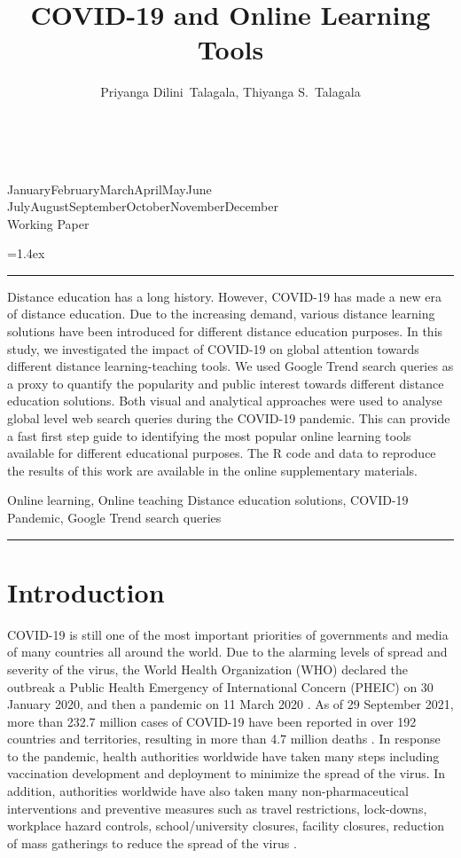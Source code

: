 \documentclass[11pt,a4paper,]{article}
\title{COVID-19 and Online Learning Tools}
\author{Priyanga Dilini~Talagala, Thiyanga S.~Talagala}
\date{\sf\Date~\Month~\Year}
\makeatletter
\def\Date{\number\day}
\def\Month{\ifcase\month\or
 January\or February\or March\or April\or May\or June\or
 July\or August\or September\or October\or November\or December\fi}
\def\Year{\number\year}
\def\showjel{{\large\textsf{\textbf{JEL classification:}}~\@jel}}
\def\cover{{\sffamily\setcounter{page}{0}
        \thispagestyle{empty}
        \vspace*{2cm}
        \begin{center}
        \fbox{\parbox{14cm}{\begin{onehalfspace}\centering\Huge\vspace*{0.3cm}
                \textsf{\textbf{\expandafter{\@title}}}\vspace{1cm}\par
                \LARGE\@author\end{onehalfspace}
        }}
        \end{center}
        \vfill
                \begin{center}\Large
                \Month~\Year\\[1cm]
                Working Paper \@wp
        \end{center}\vspace*{2cm}}}
\def\pageone{{\sffamily\setstretch{1}%
        \thispagestyle{empty}%
        \vbox to \textheight{%
        \raggedright\baselineskip=1.2cm
     {\fontsize{24.88}{30}\sffamily\textbf{\expandafter{\@title}}}
        \vspace{2cm}\par
        \hspace{1cm}\parbox{14cm}{\sffamily\large\@addresses}\vspace{1cm}\vfill
        \hspace{1cm}{\large\Date~\Month~\Year}\\[1cm]
        \hspace{1cm}\showjel\vss}}}
\def\blindtitle{{\sffamily
     \thispagestyle{plain}\raggedright\baselineskip=1.2cm
     {\fontsize{24.88}{30}\sffamily\textbf{\expandafter{\@title}}}\vspace{1cm}\par
        }}
\def\titlepage{{\cover\newpage\pageone\newpage\blindtitle}}
\let\maketitle\titlepage
\newenvironment{keywords}{\par\vspace{0.5cm}\noindent{\sffamily\textbf{Keywords:}}}{\vspace{0.25cm}\par\hrule\vspace{0.5cm}\par}
\renewenvironment{abstract}{\begin{minipage}{\textwidth}\parskip=1.4ex\noindent
\hrule\vspace{0.1cm}\par{\sffamily\textbf{\abstractname}}\newline}
  {\end{minipage}}
\makeatother
\begin{document}
\maketitle
\begin{abstract}
Distance education has a long history. However, COVID-19 has made a new era of distance education. Due to the increasing demand, various distance learning solutions have been introduced for different distance education purposes. In this study, we investigated the impact of COVID-19 on global attention towards different distance learning-teaching tools. We used Google Trend search queries as a proxy to quantify the popularity and public interest towards different distance education solutions. Both visual and analytical approaches were used to analyse global level web search queries during the COVID-19 pandemic. This can provide a fast first step guide to identifying the most popular online learning tools available for different educational purposes. The R code and data to reproduce the results of this work are available in the online supplementary materials.
\end{abstract}
\begin{keywords}
Online learning, Online teaching Distance education solutions, COVID-19 Pandemic, Google Trend search queries
\end{keywords}

\hypertarget{introduction}{%
\section{Introduction}\label{introduction}}

COVID-19 is still one of the most important priorities of governments and media of many countries all around the world. Due to the alarming levels of spread and severity of the virus, the World Health Organization (WHO) declared the outbreak a Public Health Emergency of International Concern (PHEIC) on 30 January 2020, and then a pandemic on 11 March 2020 \autocite{world2020timeline}. As of 29 September 2021, more than 232.7 million cases of COVID-19 have been reported in over 192 countries and territories, resulting in more than 4.7 million deaths \autocite{dong2020interactive}. In response to the pandemic, health authorities worldwide have taken many steps including vaccination development and deployment to minimize the spread of the virus. In addition, authorities worldwide have also taken many non-pharmaceutical interventions and preventive measures such as travel restrictions, lock-downs, workplace hazard controls, school/university closures, facility closures, reduction of mass gatherings to reduce the spread of the virus \autocite{chang2020modelling}.
\end{document}
